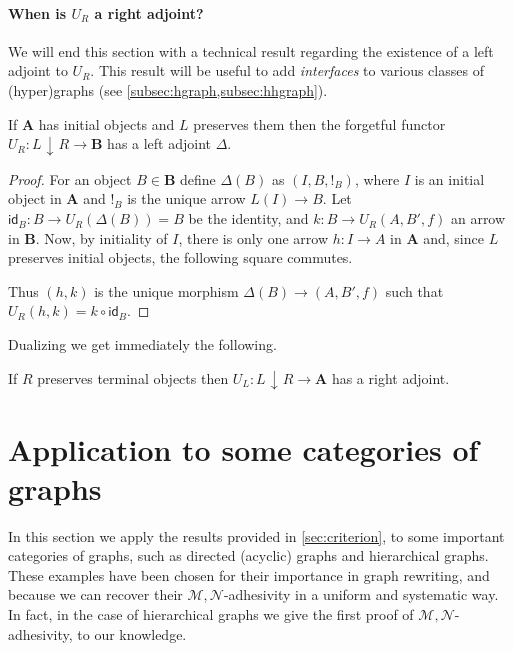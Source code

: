 \documentclass[runningheads,envcountsect]{lmcs}
\newcommand{\catname}[1]{\mathbf{#1}}
\newcommand{\id}[1]{\mathsf{id}_{#1}}
\newcommand{\comma}[2]{#1\hspace{1pt} {\downarrow}\hspace{1pt} #2}
\theoremstyle{plain}
\theoremstyle{definition}
\begin{document}
\paragraph{When is $U_R$ a right adjoint?} We will end this section with a technical result regarding the existence of a left adjoint to $U_R$. This result will be useful to add \emph{interfaces} to various classes of (hyper)graphs (see \cref{subsec:hgraph,subsec:hhgraph}).
\begin{prop}\label{prop:left}
	If $\catname{A}$ has initial objects and $L$ preserves them then the forgetful functor $U_R:\comma{L}{R}\to \catname{B}$ has a left adjoint $\Delta$.
\end{prop}
\begin{proof} For an object $B\in \catname{B}$ define $\Delta(B)$ as $(I, B, !_{B})$, where $I$ is an initial object in $\catname{A}$ and $!_{B}$ is the unique arrow $L(I)\to B$. Let $\id{B}:B\to U_R(\Delta(B))=B$ be the identity, and $k:B\to U_R(A, B', f)$ an arrow in $\catname{B}$. Now, by initiality of $I$, there is only one arrow $h:I\to A $ in $\catname{A}$ and, since $L$ preserves initial objects, the following square commutes.
	\begin{center}
	\end{center}
Thus $(h,k)$ is the unique morphism $\Delta(B)\to (A, B', f)$	such that $U_R(h,k)=k\circ \id{B}$.
\end{proof}
Dualizing we get immediately the following.
\begin{cor}If $R$ preserves terminal objects then $U_L:\comma{L}{R}\to \catname{A}$ has a right adjoint.
\end{cor}

\section{Application to some categories of graphs}\label{sec:examples}
In this section we apply the results provided in \cref{sec:criterion}, to some important categories of graphs, such as directed (acyclic) graphs and hierarchical graphs.
These examples have been chosen for their importance in graph rewriting, and because we can recover their $\mathcal{M},\mathcal{N}$-adhesivity in a uniform and systematic way.
In fact, in the case of hierarchical graphs we give the first proof of $\mathcal{M},\mathcal{N}$-adhesivity, to our knowledge.
\end{document}
